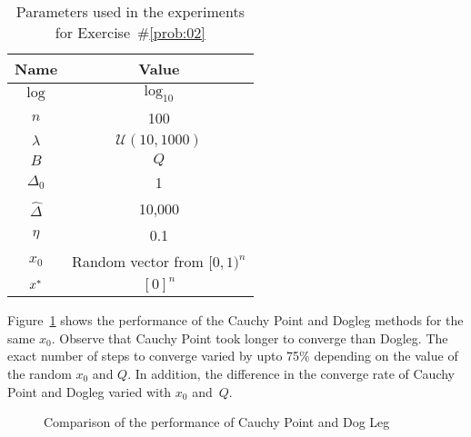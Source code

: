 \begin{table}[h]
  \caption{Parameters used in the experiments for Exercise~\#\ref{prob:02}}\label{tab:p02:experimentParameters}
  \centering
  \begin{tabular}{|c|c|}
    \hline
    \textbf{Name} & \textbf{Value} \\\hline
    \hline
    $\log$      &   $\log_{10}$\\\hline
    $n$         &   100\\\hline
    $\lambda$   &   $\mathcal{U}(10,1000)$ \\\hline
    $B$         &   $Q$ \\\hline
    $\Delta_0$  &   1 \\\hline
    $\hat{\Delta}$& 10,000 \\\hline 
    $\eta$      &   0.1\\\hline
    $x_0$       &   Random vector from $[0,1)^{n}$\\\hline
    $x^{*}$     &   $[0]^n$\\\hline
  \end{tabular}
\end{table}

Figure~\ref{fig:p02:ResultsComparison} shows the performance of the Cauchy Point and Dogleg methods for the same $x_0$.  Observe that Cauchy Point took longer to converge than Dogleg.  The exact number of steps to converge varied by upto 75\% depending on the value of the random $x_0$ and $Q$.  In addition, the difference in the converge rate of Cauchy Point and Dogleg varied with $x_0$ and~$Q$.

\begin{figure}
  
  \caption{Comparison of the performance of Cauchy Point and Dog Leg}\label{fig:p02:ResultsComparison}
\end{figure}

